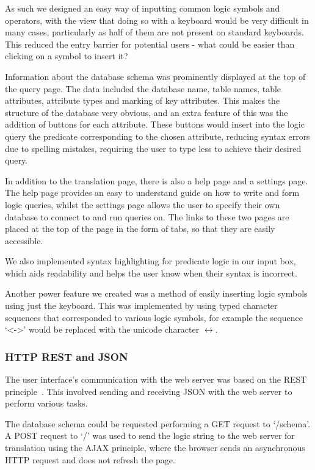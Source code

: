 \documentclass[a4paper, 11pt]{article}
\begin{document}
      As such we designed an easy way of inputting common logic symbols and
      operators, with the view that doing so with a keyboard would be very
      difficult in many cases, particularly as half of them are not present on
      standard keyboards. This reduced the entry barrier for potential users -
      what could be easier than clicking on a symbol to insert it?

      Information about the database schema was prominently displayed at the top
      of the query page. The data included the database name, table names, table
      attributes, attribute types and marking of key attributes. This makes the
      structure of the database very obvious, and an extra feature of this was
      the addition of buttons for each attribute. These buttons would insert
      into the logic query the predicate corresponding to the chosen attribute,
      reducing syntax errors due to spelling mistakes, requiring the user to
      type less to achieve their desired query.

      In addition to the translation page, there is also a help page and a
      settings page. The help page provides an easy to understand guide on how
      to write and form logic queries, whilst the settings page allows the user
      to specify their own database to connect to and run queries on. The links
      to these two pages are placed at the top of the page in the form of tabs,
      so that they are easily accessible.

      We also implemented syntax highlighting for predicate logic in our input
      box, which aids readability and helps the user know when their syntax is
      incorrect.

      Another power feature we created was a method of easily inserting logic
      symbols using just the keyboard. This was implemented by using typed
      character sequences that corresponded to various logic symbols, for
      example the sequence `<->' would be replaced with the unicode character
      $\leftrightarrow$.

    \subsubsection{HTTP REST and JSON}
      The user interface's communication with the web server was based on the
      REST principle~\cite{rest}. This involved sending and receiving JSON with
      the web server to perform various tasks.

      The database schema could be requested performing a GET request to
      `/schema'. A POST request to `/' was used to send the logic string to the
      web server for translation using the AJAX principle, where the browser
      sends an asynchronous HTTP request and does not refresh the page.
\end{document}

